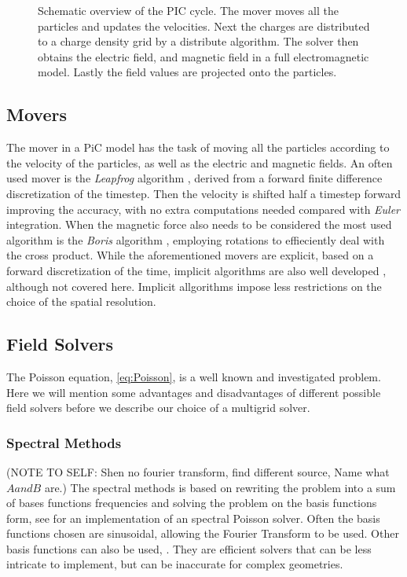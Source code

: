     \begin{figure}
        \center
        
        \caption{Schematic overview of the PIC cycle. The mover moves all the particles and updates the velocities.
        Next the charges are distributed to a charge density grid by a distribute algorithm. The solver then
        obtains the electric field, and magnetic field in a full electromagnetic model. Lastly the field values are
		projected onto the particles.}
        \label{fig:schematic}
    \end{figure}

	\subsection{Movers}
		The mover in a PiC model has the task of moving all the particles according to
		the velocity of the particles, as well as the electric and magnetic fields.
		An often used mover is the \textit{Leapfrog} algorithm \citep{birdsall_plasma_2004},
 		derived from a forward finite difference discretization of the timestep. Then the
 		velocity is shifted half a timestep forward improving the accuracy, with no extra computations needed compared
		with \textit{Euler} integration. When the magnetic force also needs to be considered
		the most used algorithm is the  \textit{Boris} algorithm \citep{qin_why_2013}, employing rotations to effieciently deal with
		the cross product.
		While the aforementioned movers are explicit, based on a forward discretization of the time,
 		implicit algorithms are also well developed \citep{friedman_direct_1981}, although not covered here.
 		Implicit allgorithms impose less restrictions on the choice of the spatial resolution.


    \subsection{Field Solvers}
	\label{sec:solvers}
    The Poisson equation, \cref{eq:Poisson}, is a well known and investigated problem.
    Here we will mention some advantages and disadvantages of different possible
    field solvers before we describe our choice of a multigrid solver.

    \subsubsection{Spectral Methods} (NOTE TO SELF: Shen no fourier transform, find different source, Name what \(A and B\) are.)
    	The spectral methods is based on rewriting the problem into a sum of bases functions
		frequencies and solving the problem on the basis functions form, see \citet{israeli_accurate_2005} for an
    	implementation of an spectral Poisson solver. Often the basis functions chosen are
 		sinusoidal, allowing the Fourier Transform to be used. Other basis functions can also be used,
		\see \citet{shen_efficient_1994}. They are efficient solvers that
    	can be less intricate to implement, but can be inaccurate for complex geometries.

